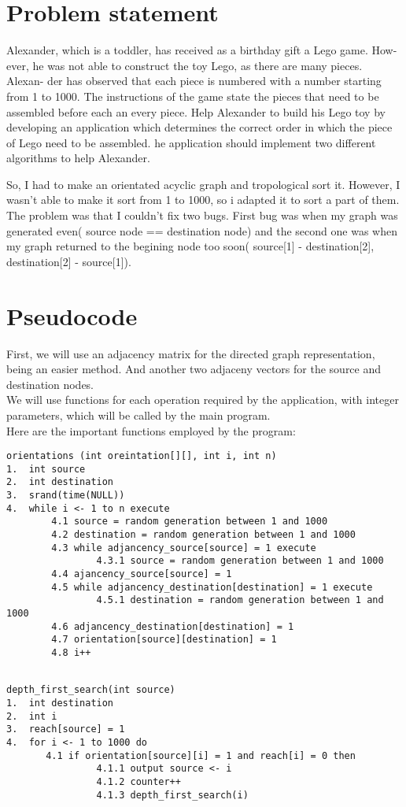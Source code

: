 \documentclass[14pt]{article}
\begin{document}
\section*{Problem statement}
Alexander, which is a toddler, has received as a birthday gift a Lego game. How-
ever, he was not able to construct the toy Lego, as there are many pieces. Alexan-
der has observed that each piece is numbered with a number starting from 1 to
1000. The instructions of the game state the pieces that need to be assembled
before each an every piece. Help Alexander to build his Lego toy by developing
an application which determines the correct order in which the piece of Lego
need to be assembled. he application should implement two different algorithms
to help Alexander.

So, I had to make an orientated acyclic graph and tropological sort it. However, I wasn't able to make it sort from 1 to 1000, so i adapted it to sort a part of them. The problem was that I couldn't fix two bugs. First bug was when my graph was generated even( source node == destination node) and the second one was when my graph returned to the begining node too soon( source[1] - destination[2], destination[2] - source[1]).

\newpage
\section*{Pseudocode}
First, we will use an adjacency matrix for the directed graph representation, being an easier method. And another two adjaceny vectors for the source and destination nodes.
\\
We will use functions for each operation required by the application, with integer parameters, which will be called by the main program.
\\
Here are the important functions employed by the program:
\begin{lstlisting}
orientations (int oreintation[][], int i, int n)
1.	int source
2.	int destination
3.	srand(time(NULL))
4.	while i <- 1 to n execute
	    4.1 source = random generation between 1 and 1000
	    4.2 destination = random generation between 1 and 1000
	    4.3 while adjancency_source[source] = 1 execute
	            4.3.1 source = random generation between 1 and 1000
	    4.4 ajancency_source[source] = 1   
	    4.5 while adjancency_destination[destination] = 1 execute
	            4.5.1 destination = random generation between 1 and 1000
	    4.6 adjancency_destination[destination] = 1
	    4.7 orientation[source][destination] = 1
	    4.8 i++
	    
\end{lstlisting}
\begin{lstlisting}
depth_first_search(int source)
1.	int destination
2.	int i
3.	reach[source] = 1
4.	for i <- 1 to 1000 do
       4.1 if orientation[source][i] = 1 and reach[i] = 0 then
                4.1.1 output source <- i
                4.1.2 counter++
                4.1.3 depth_first_search(i)
\end{lstlisting}
\end{document}
